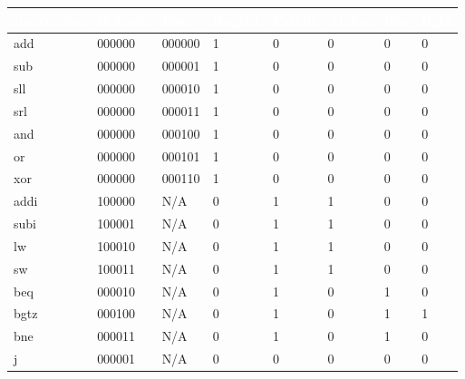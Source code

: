 \documentclass{article}
\begin{document}
\begin{tcolorbox}[colback=white!5!white,colframe=violet!75!black,title=Maparea semnalelor de control]
\begin{tabularx}{\linewidth}{ |l|X|X|X|X|X|X|X|}
\hline
\rowcolor{violet!75!black} \textcolor{white}{Instruction}  & \textcolor{white}{OpCode} & \textcolor{white}{Func} & \textcolor{white}{RegDst} & \textcolor{white}{ExtOp} & \textcolor{white}{AluSrc} & \textcolor{white}{Beq} & \textcolor{white}{Bgtz} \\
\hline
\rowcolor{violet!20!white} add & 000000 & 000000 & 1 & 0 & 0 & 0 & 0 \\
\hline
sub & 000000 & 000001 & 1 & 0 & 0 & 0 & 0 \\
\hline
\rowcolor{violet!20!white} sll & 000000 & 000010 & 1 & 0 & 0 & 0 & 0 \\
\hline
srl & 000000 & 000011 & 1 & 0 & 0 & 0 & 0 \\
\hline
\rowcolor{violet!20!white} and & 000000 & 000100 & 1 & 0 & 0 & 0 & 0 \\
\hline
or & 000000 & 000101 & 1 & 0 & 0 & 0 & 0 \\
\hline
\rowcolor{violet!20!white} xor & 000000 & 000110 & 1 & 0 & 0 & 0 & 0 \\
\hline
addi & 100000 & N/A & 0 & 1 & 1 & 0 & 0 \\
\hline
\rowcolor{violet!20!white} subi & 100001 & N/A & 0 & 1 & 1 & 0 & 0 \\
\hline
lw & 100010 & N/A & 0 & 1 & 1 & 0 & 0 \\
\hline
\rowcolor{violet!20!white} sw & 100011 & N/A & 0 & 1 & 1 & 0 & 0 \\
\hline
beq & 000010 & N/A & 0 & 1 & 0 & 1 & 0 \\
\hline
\rowcolor{violet!20!white} bgtz & 000100 & N/A & 0 & 1 & 0 & 1 & 1 \\
\hline
bne & 000011 & N/A & 0 & 1 & 0 & 1 & 0 \\
\hline
\rowcolor{violet!20!white} j & 000001 & N/A & 0 & 0 & 0 & 0 & 0 \\ 
\hline
\end{tabularx}

\vspace{1em}


\end{tcolorbox}
\end{document}
